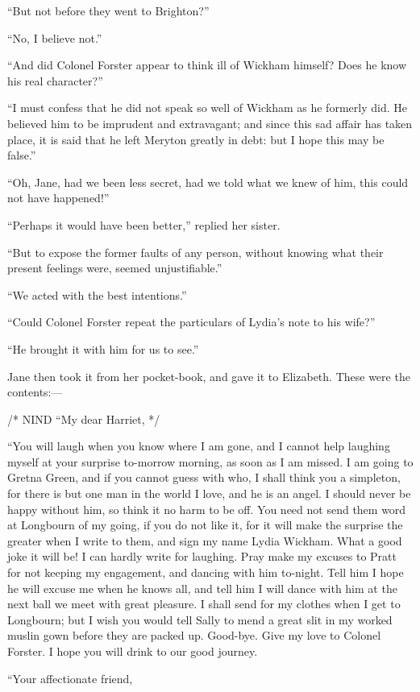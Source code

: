 \documentclass[12pt]{book}
\begin{document}
``But not before they went to Brighton?''

``No, I believe not.''

``And did Colonel Forster appear to think ill of Wickham himself? Does he know his real character?''

``I must confess that he did not speak so well of Wickham as he formerly did. He believed him to be imprudent and extravagant; and since this sad affair has taken place, it is said that he left Meryton greatly in debt: but I hope this may be false.''

``Oh, Jane, had we been less secret, had we told what we knew of him, this could not have happened!''

``Perhaps it would have been better,'' replied her sister.

``But to expose the former faults of any person, without knowing what their present feelings were, seemed unjustifiable.''

``We acted with the best intentions.''

``Could Colonel Forster repeat the particulars of Lydia's note to his wife?''

``He brought it with him for us to see.''

Jane then took it from her pocket-book, and gave it to Elizabeth. These were the contents:---

/* NIND ``My dear Harriet, */

``You will laugh when you know where I am gone, and I cannot help laughing myself at your surprise to-morrow morning, as soon as I am missed. I am going to Gretna Green, and if you cannot guess with who, I shall think you a simpleton, for there is but one man in the world I love, and he is an angel. I should never be happy without him, so think it no harm to be off. You need not send them word at Longbourn of my going, if you do not like it, for it will make the surprise the greater when I write to them, and sign my name Lydia Wickham. What a good joke it will be! I can hardly write for laughing. Pray make my excuses to Pratt for not keeping my engagement, and dancing with him to-night. Tell him I hope he will excuse me when he knows all, and tell him I will dance with him at the next ball we meet with great pleasure. I shall send for my clothes when I get to Longbourn; but I wish you would tell Sally to mend a great slit in my worked muslin gown before they are packed up. Good-bye. Give my love to Colonel Forster. I hope you will drink to our good journey.

``Your affectionate friend,
\end{document}
